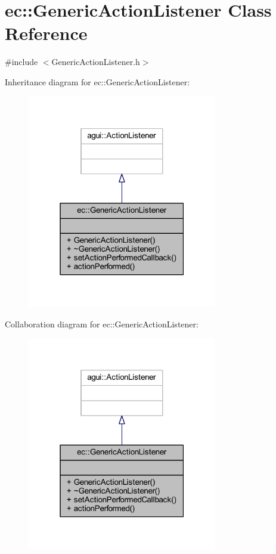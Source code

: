 \hypertarget{classec_1_1_generic_action_listener}{}\section{ec\+:\+:Generic\+Action\+Listener Class Reference}
\label{classec_1_1_generic_action_listener}


{\ttfamily \#include $<$Generic\+Action\+Listener.\+h$>$}



Inheritance diagram for ec\+:\+:Generic\+Action\+Listener\+:\nopagebreak
\begin{figure}[H]
\begin{center}
\leavevmode
\includegraphics[width=235pt]{classec_1_1_generic_action_listener__inherit__graph}
\end{center}
\end{figure}


Collaboration diagram for ec\+:\+:Generic\+Action\+Listener\+:\nopagebreak
\begin{figure}[H]
\begin{center}
\leavevmode
\includegraphics[width=235pt]{classec_1_1_generic_action_listener__coll__graph}
\end{center}
\end{figure}

